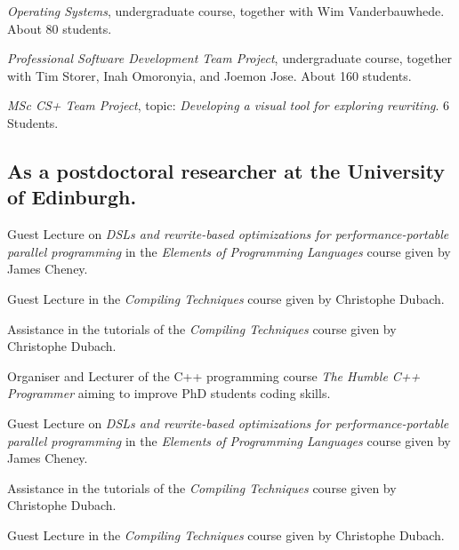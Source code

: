 \begin{cvitemize}[\small 2017 - 2018]
    \item \emph{Operating Systems}, undergraduate course, together with Wim Vanderbauwhede. About 80 students.
    \item \emph{Professional Software Development Team Project}, undergraduate course, together with  Tim Storer, Inah Omoronyia, and Joemon Jose. About 160 students.
    \item \emph{MSc CS+ Team Project}, topic: \emph{Developing a visual tool for exploring rewriting}. 6 Students.
\end{cvitemize}

\subsection{\footnotesize As a postdoctoral researcher at the University of Edinburgh.}

\begin{cvitemize}[\small 2016 - 2017]
    \item Guest Lecture on \emph{\small DSLs and rewrite-based optimizations for performance-portable parallel programming} in the \emph{Elements of Programming Languages} course given by James Cheney.
    \item Guest Lecture in the \emph{Compiling Techniques} course given by Christophe Dubach.
    \item Assistance in the tutorials of the \emph{Compiling Techniques} course given by Christophe Dubach.
\end{cvitemize}

\begin{cvitemize}[\small 2015 - 2016]
    \item Organiser and Lecturer of the C++ programming course \emph{The Humble C++ Programmer} aiming to improve PhD students coding skills.
    \item Guest Lecture on \emph{\small DSLs and rewrite-based optimizations for performance-portable parallel programming} in the \emph{Elements of Programming Languages} course given by James Cheney.
    \item Assistance in the tutorials of the \emph{Compiling Techniques} course given by Christophe Dubach.
\end{cvitemize}

\begin{cvitemize}[\small 2014 - 2015]
    \item Guest Lecture in the \emph{Compiling Techniques} course given by Christophe Dubach.
\end{cvitemize}


